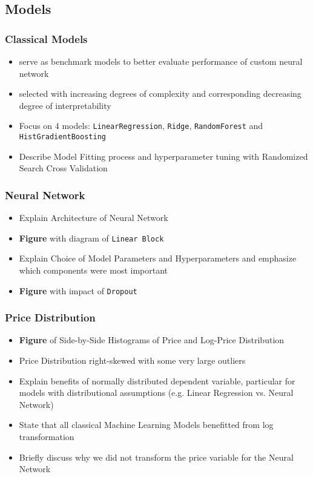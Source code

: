 \documentclass[12pt, letterpaper]{article}
\begin{document}
\subsection{Models}

\subsubsection{Classical Models}
\begin{itemize}
    \item serve as benchmark models to better evaluate performance of custom neural network
    \item selected with increasing degrees of complexity and corresponding decreasing degree of interpretability
    \item Focus on $4$ models: \texttt{LinearRegression}, \texttt{Ridge}, \texttt{RandomForest} and \texttt{HistGradientBoosting}
    \item Describe Model Fitting process and hyperparameter tuning with Randomized Search Cross Validation
\end{itemize}

\subsubsection{Neural Network}
\begin{itemize}
    \item Explain Architecture of Neural Network
    \item \textbf{Figure} with diagram of \texttt{Linear Block}
    \item Explain Choice of Model Parameters and Hyperparameters and emphasize which components were most important
    \item \textbf{Figure} with impact of \texttt{Dropout}
\end{itemize}


\subsubsection{Price Distribution}
\begin{itemize}
    \item \textbf{Figure} of Side-by-Side Histograms of Price and Log-Price Distribution
    \item Price Distribution right-skewed with some very large outliers
    \item Explain benefits of normally distributed dependent variable, particular for models with distributional assumptions (e.g. Linear Regression vs. Neural Network)
    \item State that all classical Machine Learning Models benefitted from log transformation
    \item Briefly discuss why we did not transform the price variable for the Neural Network
\end{itemize}
\end{document}
